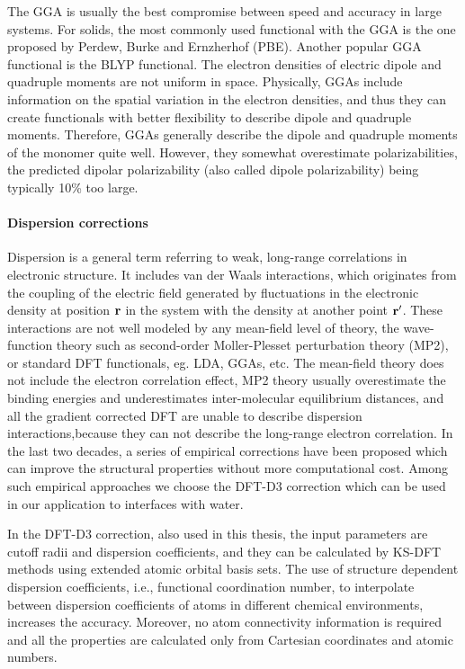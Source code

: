 The GGA is usually the best compromise between speed and accuracy in large systems. For solids, the most commonly used functional
with the GGA is the one proposed by Perdew, Burke and Ernzherhof (PBE)\cite{PBE96}.
Another popular GGA functional is the BLYP functional\cite{Becke1988,LeeC1988}.  
The electron densities of electric dipole and quadruple moments are not uniform in space.
Physically, GGAs include information on the spatial variation in the electron densities,
and thus they can create functionals with better flexibility to describe dipole and quadruple moments. 
Therefore, GGAs generally describe the dipole and quadruple moments of the monomer quite well. 
However, they somewhat overestimate polarizabilities, the predicted dipolar 
polarizability (also called dipole polarizability) being typically 10\% too large.

\paragraph{Dispersion corrections}
Dispersion is a general term referring to weak, long-range correlations in electronic structure. It includes van der Waals interactions,
which originates from the coupling of the electric field generated by fluctuations in the electronic density at position $\bf{r}$ 
in the system with the density at another point $\bf{r'}$\cite{Zeiss1977,Kohanoff06}. These interactions are not well modeled by any mean-field level of theory, 
the \abinitio wave-function theory such as second-order M{o}ller-Plesset perturbation theory (MP2), 
or standard DFT functionals, eg. LDA, GGAs, etc. 
The mean-field theory does not include the electron correlation effect, MP2 theory usually overestimate the binding energies 
and underestimates inter-molecular equilibrium distances, and all the gradient corrected DFT are unable to describe dispersion 
interactions,because they can not describe the long-range electron correlation.
In the last two decades, a series of empirical corrections have been proposed which can improve the structural properties 
without more computational cost\cite{WuX2001,WuQ2002,Zimmerli2004,Grimme2004,Grimme2006,Grimme2007,Grimme2010}.
Among such empirical approaches we  choose the DFT-D3 correction which can be used in our application to interfaces with water\cite{Grimme2010,Klimes2012}.

In the DFT-D3 correction, also used in this thesis, the input parameters are cutoff radii and dispersion coefficients, and they can be calculated by 
KS-DFT methods using extended atomic orbital basis sets. The use of structure dependent dispersion coefficients, 
i.e., functional coordination number, to interpolate between dispersion coefficients of atoms in different chemical environments, 
increases the accuracy.  Moreover, no atom connectivity information is required and all the properties are calculated only 
from Cartesian coordinates and atomic numbers\cite{Grimme2010}.

